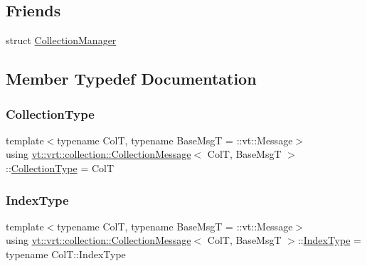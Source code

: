 \subsection*{Friends}
\begin{DoxyCompactItemize}
\item 
struct \hyperlink{structvt_1_1vrt_1_1collection_1_1_collection_message_af9288b1963f434a90b307b5305a49510}{Collection\+Manager}
\end{DoxyCompactItemize}


\subsection{Member Typedef Documentation}
\mbox{\label{structvt_1_1vrt_1_1collection_1_1_collection_message_afa8f7f5da0139ffa449144d8d35d7fe3}} 
\subsubsection{\texorpdfstring{Collection\+Type}{CollectionType}}
{\footnotesize\ttfamily template$<$typename ColT, typename Base\+MsgT = \+::vt\+::\+Message$>$ \\
using \hyperlink{structvt_1_1vrt_1_1collection_1_1_collection_message}{vt\+::vrt\+::collection\+::\+Collection\+Message}$<$ ColT, Base\+MsgT $>$\+::\hyperlink{structvt_1_1vrt_1_1collection_1_1_collection_message_afa8f7f5da0139ffa449144d8d35d7fe3}{Collection\+Type} =  ColT}

\mbox{\label{structvt_1_1vrt_1_1collection_1_1_collection_message_a324978c38e67d1bfa86c8db172e77594}} 
\subsubsection{\texorpdfstring{Index\+Type}{IndexType}}
{\footnotesize\ttfamily template$<$typename ColT, typename Base\+MsgT = \+::vt\+::\+Message$>$ \\
using \hyperlink{structvt_1_1vrt_1_1collection_1_1_collection_message}{vt\+::vrt\+::collection\+::\+Collection\+Message}$<$ ColT, Base\+MsgT $>$\+::\hyperlink{structvt_1_1vrt_1_1collection_1_1_collection_message_a324978c38e67d1bfa86c8db172e77594}{Index\+Type} =  typename Col\+T\+::\+Index\+Type}

